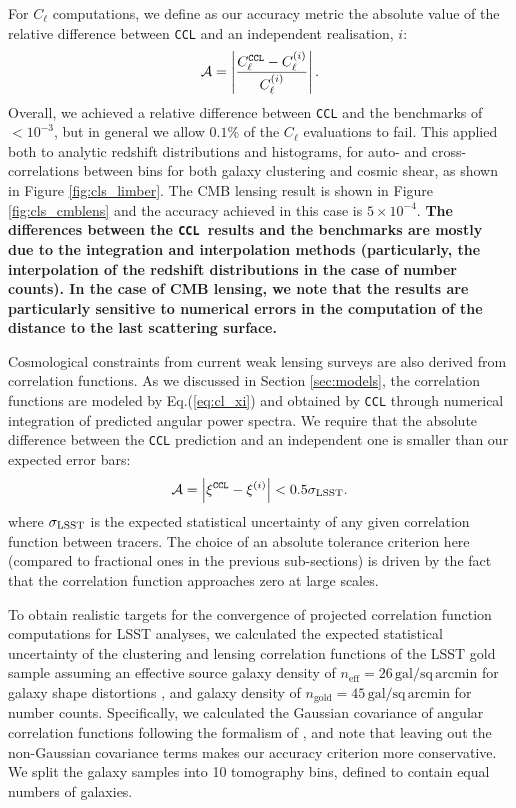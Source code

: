 \documentclass[\docopts]{\docclass}
\newcommand{\ccl}{{\tt CCL}\xspace}
\begin{document}
For $C_\ell$ computations, we define as our accuracy metric the absolute value of the relative difference between \ccl and an independent realisation, $i$:
\begin{equation}
  \mathcal{A}=\left|\frac{C_\ell^{\tt CCL}-C_\ell^{(i)}}{C_\ell^{(i)}}\right|.
\end{equation}
Overall, we achieved a relative difference between \ccl and the benchmarks of $<10^{-3}$, but in general we allow $0.1\%$ of the $C_\ell$ evaluations to fail. This applied both to analytic redshift distributions and histograms, for auto- and cross-correlations between bins for both galaxy clustering and cosmic shear, as shown in Figure \ref{fig:cls_limber}. The CMB lensing result is shown in Figure \ref{fig:cls_cmblens} and the accuracy achieved in this case is $5 \times 10^{-4}$. {\bf The differences between the \ccl~results and the benchmarks are mostly due to the integration and interpolation methods (particularly, the interpolation of the redshift distributions in the case of number counts). In the case of CMB lensing, we note that the results are particularly sensitive to numerical errors in the computation of the distance to the last scattering surface.}

Cosmological constraints from current weak lensing surveys are also derived from correlation functions. As we discussed in Section \ref{sec:models}, the correlation functions are modeled by Eq.(\ref{eq:cl_xi}) and obtained by \ccl through numerical integration of predicted angular power spectra. We require that the absolute difference between the \ccl prediction and an independent one is smaller than our expected error bars:
\begin{equation}
  \mathcal{A}=\left|\xi^{\tt CCL}-\xi^{(i)}\right|<0.5\sigma_{\rm LSST}.
\end{equation}
where $\sigma_{\rm LSST}$ is the expected statistical uncertainty of any given correlation function between tracers. The choice of an absolute tolerance criterion here (compared to fractional ones in the previous sub-sections) is driven by the fact that the correlation function approaches zero at large scales.

To obtain realistic targets for the convergence of projected correlation function computations for LSST analyses, we calculated the expected statistical uncertainty of the clustering and lensing correlation functions of the LSST gold sample \citep{LSSTSB} assuming an effective source galaxy density of $n_\mathrm{eff} = 26\,\mathrm{gal/sq\,arcmin}$ for galaxy shape distortions \citep{Chang13}, and galaxy density of $n_\mathrm{gold} = 45\,\mathrm{gal/sq\,arcmin}$ for number counts. Specifically, we calculated the Gaussian covariance of angular correlation functions following the formalism of \citet{2008A&A...477...43J}, and note that leaving out the non-Gaussian covariance terms makes our accuracy criterion more conservative. We split the galaxy samples into 10 tomography bins, defined to contain equal numbers of galaxies.
\end{document}
